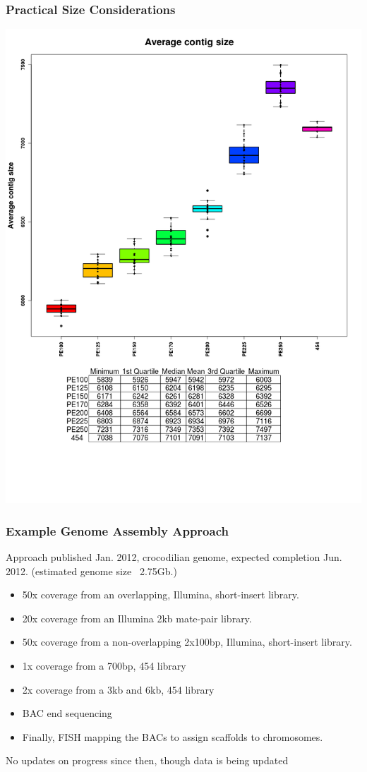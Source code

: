 \documentclass[pdf]{beamer}
\begin{document}
\begin{frame}
\frametitle{Practical Size Considerations}
\begin{center}
\includegraphics[scale=0.19]{Figures/avgContigSize.png} 
\end{center}
\end{frame}

\begin{frame}
\frametitle{Example Genome Assembly Approach}
Approach published Jan. 2012, crocodilian genome, expected completion Jun. 2012. (estimated genome size ~2.75Gb.) 
\begin{itemize}
\item 50x coverage from an overlapping, Illumina, short-insert library.
\item 20x coverage from an Illumina 2kb mate-pair library.
\item 50x coverage from a non-overlapping 2x100bp, Illumina, short-insert library.
\item 1x coverage from a 700bp, 454 library
\item 2x coverage from a 3kb and 6kb, 454 library
\item BAC end sequencing
\item Finally, FISH mapping the BACs to assign scaffolds to chromosomes.
\end{itemize}
\alert{No updates on progress since then, though data is being updated}
\end{frame}
\end{document}

